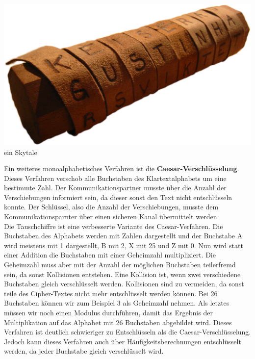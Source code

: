 \documentclass[12pt,a4paper]{report}
\begin{document}
\begin{onehalfspace}
\begin{center}
\includegraphics[scale=0.3]{img/krypto_skytale.png}\\
ein Skytale \cite{wiki10}
\end{center}

Ein weiteres monoalphabetisches Verfahren ist die \textbf{Caesar-Verschlüsselung}. Dieses Verfahren verschob alle Buchstaben des Klartextalphabets um eine bestimmte Zahl. Der Kommunikationspartner musste über die Anzahl der Verschiebungen informiert sein, da dieser sonst den Text nicht entschlüsseln konnte. Der Schlüssel, also die Anzahl der Verschiebungen, musste dem Kommunikationsparnter über einen sicheren Kanal übermittelt werden. \cite{krypto01}\\

Die Tauschchiffre ist eine verbesserte Variante des Caesar-Verfahren. Die Buchstaben des Alphabets werden mit Zahlen dargestellt und der Buchstabe A wird meistens mit 1 dargestellt, B mit 2, X mit 25 und Z mit 0. Nun wird statt einer Addition die Buchstaben mit einer Geheimzahl multipliziert. Die Geheimzahl muss aber mit der Anzahl der möglichen Buchstaben teilerfremd sein, da sonst Kollisionen entstehen. Eine Kollision ist, wenn zwei verschiedene Buchstaben gleich verschlüsselt werden. Kollisionen sind zu vermeiden, da sonst teile des Cipher-Textes nicht mehr entschlüsselt werden können. Bei 26 Buchstaben können wir zum Beispiel 3 als Geheimzahl nehmen. Als letztes müssen wir noch einen Modulus durchführen, damit das Ergebnis der Multiplikation auf das Alphabet mit 26 Buchstaben abgebildet wird. Dieses Verfahren ist deutlich schwieriger zu Entschlüsseln als die Caesar-Verschlüsselung. Jedoch kann dieses Verfahren auch über Häufigkeitsberechnungen entschlüsselt werden, da jeder Buchstabe gleich verschlüsselt wird.  \cite{krypto01}\\


\end{onehalfspace}
\end{document}
